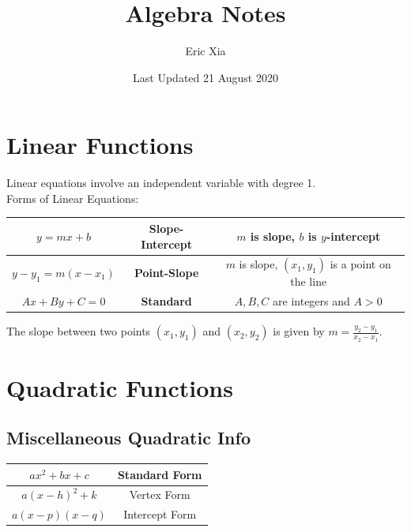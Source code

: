 \documentclass{article}
\title{Algebra Notes}
\author{Eric Xia}
\date{Last Updated 21 August 2020}
\begin{document}
    \maketitle
    \tableofcontents
    \pagebreak



    \section{Linear Functions}
    Linear equations involve an independent variable with degree 1. \\
    Forms of Linear Equations: \\

    \begin{center}
        \begin{tabular}{|c|c|c|}
            \hline
            $y=mx+b$    & \textbf{Slope-Intercept} & $m$ is slope, $b$ is $y$-intercept \\
            \hline
            $y-y_1=m(x-x_1)$ & \textbf{Point-Slope} & $m$ is slope, $(x_1, y_1)$ is a point
            on the line \\
            \hline
            $Ax+By+C=0$ & \textbf{Standard}        & $A,B,C$ are integers and $A>0$     \\
            \hline
        \end{tabular}
    \end{center}

    \noindent The slope between two points $(x_1,y_1)$ and $(x_2,y_2)$ is given by
    $m=\frac{y_2-y_1}{x_2-x_1}$.

    \pagebreak


    \section{Quadratic Functions}

    \subsection{Miscellaneous Quadratic Info}

    \begin{center}
        \begin{tabular}{|c|c|}
            \hline
            $ax^2+bx+c$   & Standard Form  \\
            \hline
            $a(x-h)^2+k$  & Vertex Form    \\
            \hline
            $a(x-p)(x-q)$ & Intercept Form \\
            \hline
        \end{tabular}
    \end{center}
\end{document}
